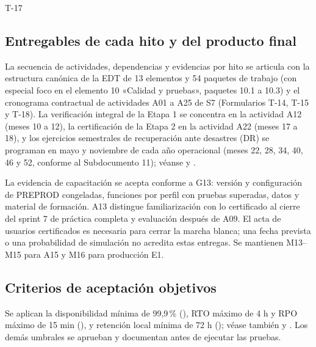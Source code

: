 \ifdefined\FormularioActual
\makeatletter
\audit@iniciarpartes
\renewcommand\@pnumwidth{2.2em}
\makeatother
{\renewcommand\textoEncabezado{\color{audit-marino}Índice}\indiceDetallado}
\clearpage
\makeatletter
{}
\makeatother
{}
{}
\fi
\begin{formulario}{T-17}
\subsection*{Entregables de cada hito y del producto final}

La secuencia de actividades, dependencias y evidencias por hito se articula con la estructura canónica de la EDT de 13 elementos y 54 paquetes de trabajo (con especial foco en el elemento 10 «Calidad y pruebas», paquetes 10.1 a 10.3) y el cronograma contractual de actividades A01 a A25 de S7 (Formularios T-14, T-15 y T-18). La verificación integral de la Etapa 1 se concentra en la actividad A12 (meses 10 a 12), la certificación de la Etapa 2 en la actividad A22 (meses 17 a 18), y los ejercicios semestrales de recuperación ante desastres (DR) se programan en mayo y noviembre de cada año operacional (meses 22, 28, 34, 40, 46 y 52, conforme al Subdocumento 11); véanse  y .

La evidencia de capacitación se acepta conforme a G13: versión y configuración de PREPROD congeladas, funciones por perfil con pruebas superadas, datos y material de formación. A13 distingue familiarización con lo certificado al cierre del sprint 7 de práctica completa y evaluación después de A09. El acta de usuarios certificados es necesaria para cerrar la marcha blanca; una fecha prevista o una probabilidad de simulación no acredita estas entregas. Se mantienen M13--M15 para A15 y M16 para producción E1.

\subsection*{Criterios de aceptación objetivos}

Se aplican la disponibilidad mínima de 99,9\,\% (), RTO máximo de 4 h y RPO máximo de 15 min (), y retención local mínima de 72 h (); véase también  y . Los demás umbrales se aprueban y documentan antes de ejecutar las pruebas.


\end{formulario}
